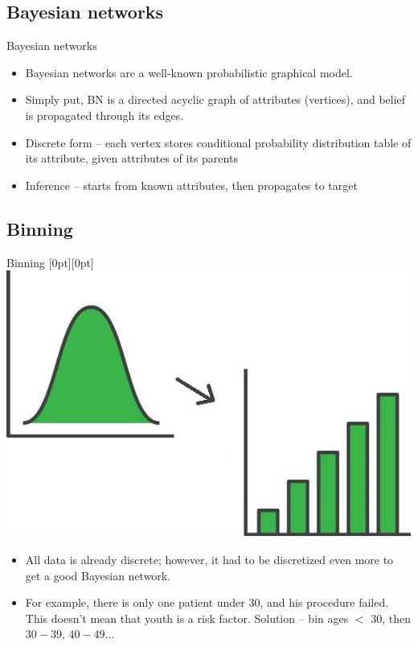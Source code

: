\documentclass[hyperref={bookmarks=false}]{beamer}
\newcommand{\lenitem}[2][.51\linewidth]{\parbox[t]{#1}{\strut #2\strut}}
\begin{document}
\subsection{Bayesian networks}
\begin{frame}{Bayesian networks}
\begin{itemize}
    \item Bayesian networks are a well-known probabilistic graphical model.
    \item Simply put, BN is a directed acyclic graph of attributes (vertices), and belief is propagated through its edges.
    \item Discrete form -- each vertex stores conditional probability distribution table of its attribute, given attributes of its parents
    \item Inference -- starts from known attributes, then propagates to target
\end{itemize}
\end{frame}

\subsection{Binning}
\begin{frame}{Binning}
\mbox{}\hfill\raisebox{-\height}[0pt][0pt]{\includegraphics[width=.42\linewidth]{binning.jpeg}}
\vspace*{-\baselineskip}

\begin{itemize}
    \item \lenitem{All data is already discrete; however, it had to be discretized even more to get a good Bayesian network.}

    \item \lenitem{For example, there is only one patient under 30, and his procedure failed. This doesn't mean that youth is a risk factor. Solution -- bin ages $<$ 30, then $30-39$, $40-49$...}
\end{itemize}
\end{frame}
\end{document}
